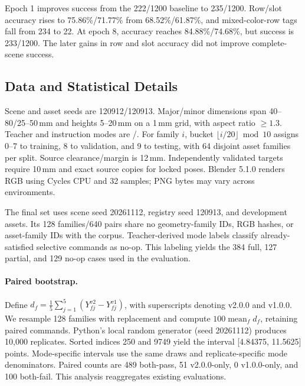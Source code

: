 Epoch 1 improves success from the 222/1200 baseline to 235/1200. Row/slot accuracy rises to 75.86\%/71.77\% from 68.52\%/61.87\%, and mixed-color-row tags fall from 234 to 22. At epoch 8, accuracy reaches 84.88\%/74.68\%, but success is 233/1200. The later gains in row and slot accuracy did not improve complete-scene success.

\subsection{Data and Statistical Details}
\label{app:statistics}
Scene and asset seeds are 120912/120913. Major/minor dimensions span 40--80/25--50\,mm and heights 5--20\,mm on a 1\,mm grid, with aspect ratio $\geq1.3$. Teacher and instruction modes are /. For family $i$, bucket $\lfloor i/20\rfloor\bmod10$ assigns 0--7 to training, 8 to validation, and 9 to testing, with 64 disjoint asset families per split. Source clearance/margin is 12\,mm. Independently validated targets require 10\,mm and exact source copies for locked poses. Blender 5.1.0 renders RGB using Cycles CPU and 32 samples; PNG bytes may vary across environments.

The final set uses scene seed 20261112, registry seed 120913, and development assets. Its 128 families/640 pairs share no geometry-family IDs, RGB hashes, or asset-family IDs with the corpus. Teacher-derived mode labels classify already-satisfied selective commands as no-op. This labeling yields the 384 full, 127 partial, and 129 no-op cases used in the evaluation.

\paragraph{Paired bootstrap.}
Define $d_f=\frac15\sum_{j=1}^{5}(Y^{v2}_{fj}-Y^{v1}_{fj})$, with superscripts denoting v2.0.0 and v1.0.0. We resample 128 families with replacement and compute $100\operatorname{mean}_f d_f$, retaining paired commands. Python's local random generator (seed 20261112) produces 10,000 replicates. Sorted indices 250 and 9749 yield the interval [4.84375, 11.5625] points. Mode-specific intervals use the same draws and replicate-specific mode denominators. Paired counts are 489 both-pass, 51 v2.0.0-only, 0 v1.0.0-only, and 100 both-fail. This analysis reaggregates existing evaluations.

